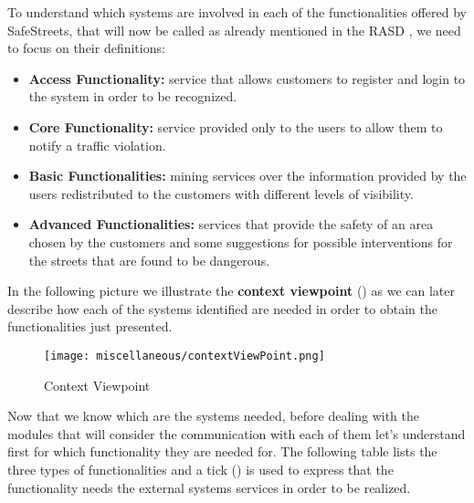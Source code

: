 			To understand which systems are involved in each of the functionalities offered by SafeStreets, that will now be called as already mentioned in the RASD \cite{RASD}, we need to focus on their definitions:
			
			\begin{itemize}
				\item \textbf{Access Functionality:} service that allows customers to register and login to the system in order to be recognized.
				\item \textbf{Core Functionality:} service provided only to the users to allow them to notify a traffic violation.
				\item \textbf{Basic Functionalities:} mining services over the information provided by the users redistributed to the customers with different levels of visibility.
				\item \textbf{Advanced Functionalities:} services that provide the safety of an area chosen by the customers and some suggestions for possible interventions for the streets that are found to be dangerous.
			\end{itemize}
		
			In the following picture we illustrate the \textbf{context viewpoint} () as we can later describe how each of the systems identified are needed in order to obtain the functionalities just presented.
			
			\newpage
			
			\begin{figure}[ht]
				\centering
				\texttt{[image: miscellaneous/contextViewPoint.png]}
				\caption{\label{fig:contextViewpoint} Context Viewpoint}
			\end{figure}
		
			Now that we know which are the systems needed, before dealing with the modules that will consider the communication with each of them let's understand first for which functionality they are needed for. The following table lists the three types of functionalities and a tick (\xtick) is used to express that the functionality needs the external systems services in order to be realized.
			
			\begin{center}
				 
			\end{center}
		
